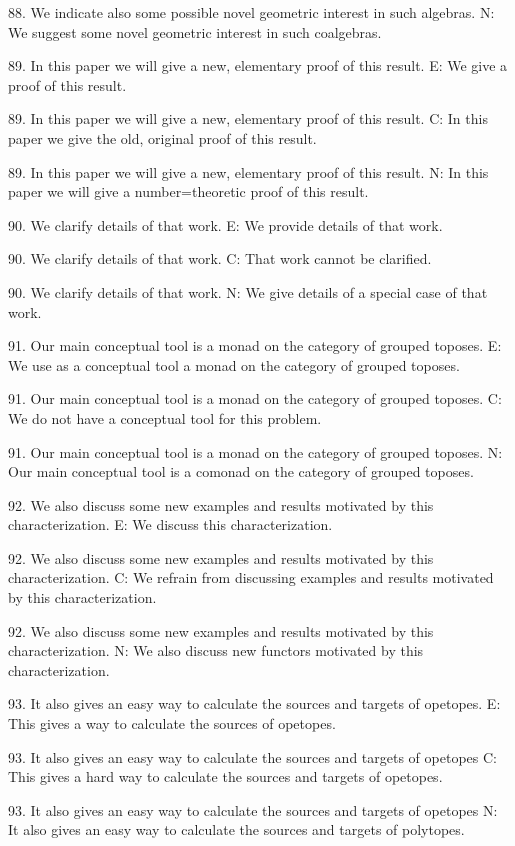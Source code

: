 88. We indicate also some possible novel geometric interest in such algebras.
N: We suggest some novel geometric interest in such coalgebras.

89. In this paper we will give a new, elementary proof of this result.
E: We give a proof of this result.

89. In this paper we will give a new, elementary proof of this result.
C: In this paper we give the old, original proof of this result.

89. In this paper we will give a new, elementary proof of this result.
N: In this paper we will give a number=theoretic proof of this result.

90. We clarify details of that work.
E: We provide details of that work.

90. We clarify details of that work.
C: That work cannot be clarified.

90. We clarify details of that work.
N: We give details of a special case of that work.

91. Our main conceptual tool is a monad on the category of grouped toposes.
E: We use as a conceptual tool a monad on the category of grouped toposes.

91. Our main conceptual tool is a monad on the category of grouped toposes.
C: We do not have a conceptual tool for this problem.

91. Our main conceptual tool is a monad on the category of grouped toposes.
N: Our main conceptual tool is a comonad on the category of grouped toposes.

92. We also discuss some new examples and results motivated by this characterization.
E: We discuss this characterization.

92. We also discuss some new examples and results motivated by this characterization.
C: We refrain from discussing examples and results motivated by this characterization.

92. We also discuss some new examples and results motivated by this characterization.
N: We also discuss new functors motivated by this characterization.

93. It also gives an easy way to calculate the sources and targets of opetopes.
E: This gives a way to calculate the sources of opetopes.

93. It also gives an easy way to calculate the sources and targets of opetopes
C: This gives a hard way to calculate the sources and targets of opetopes.

93. It also gives an easy way to calculate the sources and targets of opetopes
N: It also gives an easy way to calculate the sources and targets of polytopes.
 
